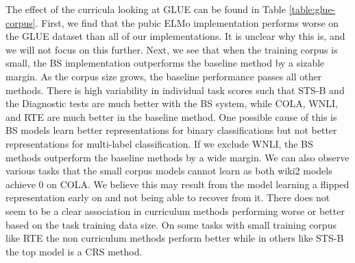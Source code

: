 \begin{table}[]
\caption{GLUE results for competence replacement methods and baselines trained on wikitext-2.}
\label{table:glue-corpus}
\end{table}
The effect of the curricula looking at GLUE can be found in Table \ref{table:glue-corpus}. First, we find that the pubic ELMo implementation performs worse on the GLUE dataset than all of our implementations. It is unclear why this is, and we will not focus on this further. Next, we see that when the training corpus is small, the BS implementation outperforms the baseline method by a sizable margin. As the corpus size grows, the baseline performance passes all other methods. There is high variability in individual task scores such that STS-B and the Diagnostic tests are much better with the BS system, while COLA, WNLI, and RTE are much better in the baseline method. One possible cause of this is BS models learn better representations for binary classifications but not better representations for multi-label classification. If we exclude WNLI, the BS methods outperform the baseline methods by a wide margin. We can also observe various tasks that the small corpus models cannot learn as both wiki2 models achieve 0 on COLA. We believe this may result from the model learning a flipped representation early on and not being able to recover from it. There does not seem to be a clear association in curriculum methods performing worse or better based on the task training data size. On some tasks with small training corpus like RTE the non curriculum methods perform better while in others like STS-B the top model is a CRS method.
